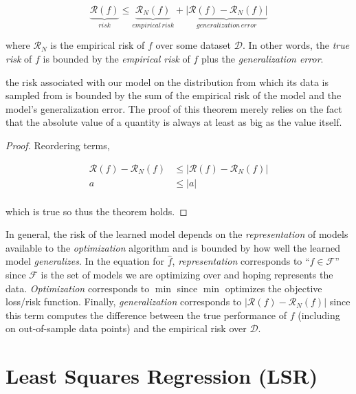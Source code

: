 \begin{theorem} 
    $$\underbrace{\mathcal{R}(f)}_{risk} \leq \underbrace{\mathcal{R}_{N}(f)}_{empirical\,risk}+\underbrace{\left|\mathcal{R}(f)-\mathcal{R}_{N}(f)\right|}_{generalization\,error}$$

where $\mathcal{R}_{N}$ is the empirical risk of $f$ over some dataset $\mathcal{D}$. In other words, the \textit{true risk} of $f$ is bounded by the \textit{empirical risk} of $f$ plus the \textit{generalization error}.
\end{theorem}

the risk associated with our model on the distribution from which its data is sampled from is bounded by the sum of the empirical risk of the model and the model's generalization error. The proof of this theorem merely relies on the fact that the absolute value of a quantity is always at least as big as the value itself. 



\begin{proof}
Reordering terms,

\begin{align*}
\mathcal{R}(f) - \mathcal{R}_{N}(f) &\le |\mathcal{R}(f) - \mathcal{R}_{N}(f)| \\
a &\le |a|\\
\end{align*}

which is true so thus the theorem holds.
\end{proof}

In general, the risk of the learned model depends on the \textit{representation} of models available to the \textit{optimization} algorithm and is bounded by how well the learned model \textit{generalizes}. In the equation for $\hat{f}$, \textit{representation} corresponds to ``$f \in \mathcal{F}$'' since $\mathcal{F}$ is the set of models we are optimizing over and hoping represents the data. \textit{Optimization} corresponds to $\min$ since $\min$ optimizes the objective loss/risk function. Finally, \textit{generalization} corresponds to $|\mathcal{R}(f) - \mathcal{R}_N(f)|$ since this term computes the difference between the true performance of $f$ (including on out-of-sample data points) and the empirical risk over $\mathcal{D}$.

\section{Least Squares Regression (LSR)}

